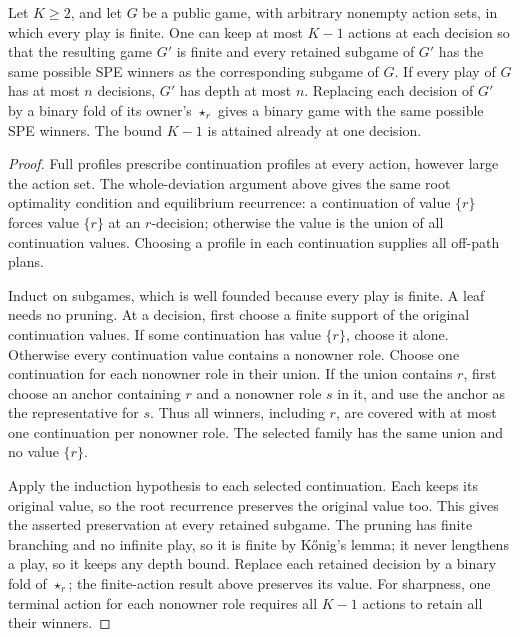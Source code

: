 \begin{proposition}\label{game:prop:choice-support}
Let $K\geq2$, and let $G$ be a public game, with arbitrary nonempty
action sets, in which every play is finite. One can keep
at most $K-1$ actions at each decision so that the resulting game
$G'$ is finite and every retained subgame of $G'$ has the
same possible SPE winners as the corresponding subgame of $G$. If every
play of $G$ has at most $n$ decisions, $G'$ has depth at most $n$. Replacing
each decision of $G'$ by a binary fold of its owner's $\star_r$ gives a binary game
with the same possible SPE winners. The bound $K-1$ is attained already
at one decision.
\end{proposition}
\begin{proof}
Full profiles prescribe continuation profiles at every action, however
large the action set. The whole-deviation argument above gives the same
root optimality condition and equilibrium recurrence: a continuation of
value $\{r\}$ forces value $\{r\}$ at an $r$-decision; otherwise the
value is the union of all continuation values. Choosing a profile in
each continuation supplies all off-path plans.

Induct on subgames, which is well founded because every play is finite.
A leaf needs no pruning. At a decision,
first choose a finite support of the original continuation values.
If some continuation has value $\{r\}$, choose it alone. Otherwise
every continuation value contains a nonowner role. Choose one continuation
for each nonowner role in their union. If the union contains $r$, first
choose an anchor containing $r$ and a nonowner role $s$ in it, and use
the anchor as the representative for $s$. Thus all winners, including
$r$, are covered with at most one continuation per nonowner role.
The selected family has the same union and no value $\{r\}$.

Apply the induction hypothesis to each selected continuation. Each keeps
its original value, so the root recurrence preserves the original value
too. This gives the asserted preservation at every retained subgame.
The pruning has finite branching and no infinite play, so it is finite
by K\H{o}nig's lemma; it never lengthens a play, so it keeps any depth
bound. Replace each retained decision by a binary fold of
$\star_r$; the finite-action result above preserves its value.
For sharpness, one terminal action for each nonowner role requires all
$K-1$ actions to retain all their winners.
\end{proof}


